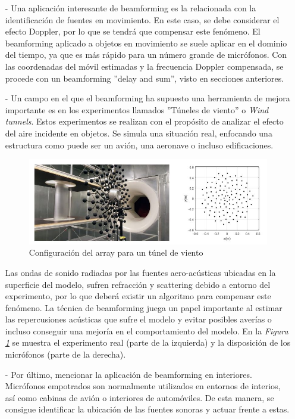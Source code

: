 \documentclass[a4paper,11pt]{book}
\begin{document}
			
			\begin{itemize}
				\item[-] Una aplicación interesante de beamforming es la relacionada con la identificación de fuentes en movimiento. En este caso, se debe considerar el efecto Doppler, por lo que se tendrá que compensar este fenómeno. El beamforming aplicado a objetos en movimiento se suele aplicar en el dominio del tiempo, ya que es más rápido para un número grande de micrófonos. Con las coordenadas del móvil estimadas y la frecuencia Doppler compensada, se procede con un beamforming ''delay and sum'', visto en secciones anteriores.
				\item[-] Un campo en el que el beamforming ha supuesto una herramienta de mejora importante es en los experimentos llamados ''Túneles de viento'' o \textit{Wind tunnels}. Estos experimentos se realizan con el propósito de analizar el efecto del aire incidente en objetos. Se simula una situación real, enfocando una estructura como puede ser un avión, una aeronave o incluso edificaciones. 
			\begin{figure}[hbtp]
			\centering
			\includegraphics[width = 12cm]{FIGURAS/wind_tunnel.JPG}
			\caption{Configuración del array para un túnel de viento}
			\label{tunel}
			\end{figure}
			
			Las ondas de sonido radiadas por las fuentes aero-acústicas ubicadas en la superficie del modelo, sufren refracción y scattering debido a entorno del experimento, por lo que deberá existir un algoritmo para compensar este fenómeno. La técnica de beamforming juega un papel importante al estimar las repercusiones acústicas que sufre el modelo y evitar posibles averías o incluso conseguir una mejoría en el comportamiento del modelo. En la \textit{Figura \ref{tunel}} se muestra el experimento real (parte de la izquierda) y la disposición de los micrófonos (parte de la derecha).
				\item[-] Por último, mencionar la aplicación de beamforming en interiores. Micrófonos empotrados son normalmente utilizados en entornos de interios, así como cabinas de avión o interiores de automóviles. De esta manera, se consigue identificar la ubicación de las fuentes sonoras y actuar frente a estas.
			\end{itemize}
			
\end{document}
